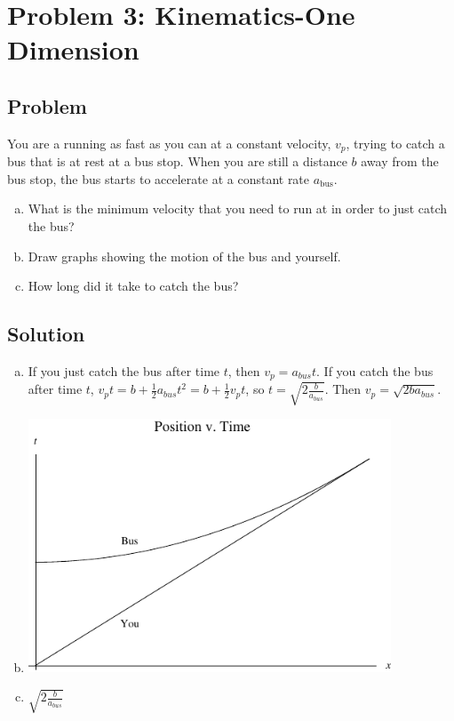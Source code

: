 \documentclass[solutions]{esg8012pset}
\begin{document}
\section*{Problem 3: Kinematics-One Dimension}
\subsection*{Problem}
  You are a running as fast as you can at a constant velocity, $v_p$, trying to catch a bus that is at rest
  at a bus stop. When you are still a distance $b$ away from the bus stop, the bus starts to accelerate
  at a constant rate $a_\text{bus}$.
  \begin{enumerate}[a)]
    \item What is the minimum velocity that you need to run at in order to just catch the bus?
    \item Draw graphs showing the motion of the bus and yourself.
    \item How long did it take to catch the bus?
  \end{enumerate}
\subsection*{Solution}
  \begin{enumerate}[a)]
    \item If you just catch the bus after time $t$, then $v_p = a_{bus}t$.  If you catch the bus after time $t$, $v_p t = b + \frac{1}{2}a_{bus}t^2 = b + \frac{1}{2}v_p t$, so $t = \sqrt{2\frac{b}{a_{bus}}}$.  Then $v_p = \sqrt{2 b a_{bus}}$.
    \item \includegraphics[width=0.85\textwidth]{ps01_Plot_4}
    \item $\sqrt{2\frac{b}{a_{bus}}}$
  \end{enumerate}
\end{document}
